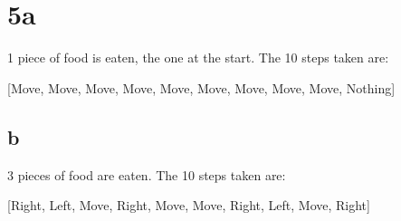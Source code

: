 \documentclass[12pt]{article}
\begin{document}
\section{5a}
1 piece of food is eaten, the one at the start.  The 10 steps taken are:
\begin{center}
[Move, Move, Move, Move, Move, Move, Move, Move, Move, Nothing]
\end{center}

\subsection{b}
3 pieces of food are eaten.  The 10 steps taken are:
\begin{center}
[Right, Left, Move, Right, Move, Move, Right, Left, Move, Right]
\end{center}
\end{document}
